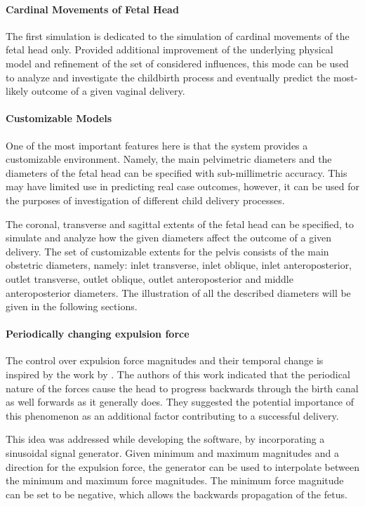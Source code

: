 \paragraph{Cardinal Movements of Fetal Head}
The first simulation is dedicated to the simulation of cardinal movements of the fetal head only. Provided additional improvement of the underlying physical model and refinement of the set of considered influences, this mode can be used to analyze and investigate the childbirth process and eventually predict the most-likely outcome of a given vaginal delivery.


\paragraph{Customizable Models}
One of the most important features here is that the system provides a customizable environment. Namely, the main pelvimetric diameters and the diameters of the fetal head can be specified with sub-millimetric accuracy. This may have limited use in predicting real case outcomes, however, it can be used for the purposes of investigation of different child delivery processes.

The coronal, transverse and sagittal extents of the fetal head can be specified, to simulate and analyze how the given diameters affect the outcome of a given delivery. The set of customizable extents for the pelvis consists of the main obstetric diameters, namely: inlet transverse, inlet oblique, inlet anteroposterior, outlet transverse, outlet oblique, outlet anteroposterior and middle anteroposterior diameters. The illustration of all the described diameters will be given in the following sections.

\paragraph{Periodically changing expulsion force}
The control over expulsion force magnitudes and their temporal change is inspired by the work by \citet{Moreau}. The authors of this work indicated that the periodical nature of the forces cause the head to progress backwards through the birth canal as well forwards as it generally does. They suggested the potential importance of this phenomenon as an additional factor contributing to a successful delivery.

This idea was addressed while developing the software, by incorporating a sinusoidal signal generator. Given minimum and maximum magnitudes and a direction for the expulsion force, the generator can be used to interpolate between the minimum and maximum force magnitudes. The minimum force magnitude can be set to be negative, which allows the backwards propagation of the fetus.

